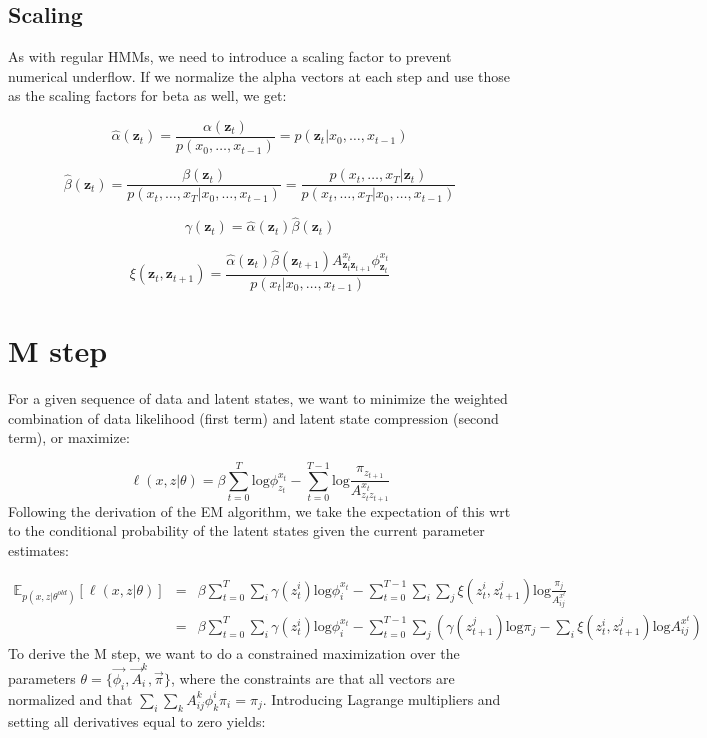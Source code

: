 \documentclass[11pt]{article}
\begin{document}
\subsection{Scaling}

As with regular HMMs, we need to introduce a scaling factor to prevent numerical underflow.  If we normalize the alpha vectors at each step and use those as the scaling factors for beta as well, we get:

\[
\hat{\alpha}(\mathbf{z}_t) = \frac{\alpha(\mathbf{z}_t)}{p(x_0,\ldots,x_{t-1})} = p(\mathbf{z}_t|x_0,\ldots,x_{t-1})
\]

\[
\hat{\beta}(\mathbf{z}_t) = \frac{\beta(\mathbf{z}_t)}{p(x_t,\ldots,x_T|x_0,\ldots,x_{t-1})} = \frac{p(x_t,\ldots,x_T|\mathbf{z}_t)}{p(x_t,\ldots,x_T|x_0,\ldots,x_{t-1})}
\]

\[
\gamma(\mathbf{z}_t) = \hat{\alpha}(\mathbf{z}_t)\hat{\beta}(\mathbf{z}_t)
\]

\[
\xi(\mathbf{z}_t,\mathbf{z}_{t+1}) = \frac{\hat{\alpha}(\mathbf{z}_t)\hat{\beta}(\mathbf{z}_{t+1})A^{x_t}_{\mathbf{z}_t\mathbf{z}_{t+1}}\phi^{x_t}_{\mathbf{z}_t}}{p(x_t|x_0,\ldots,x_{t-1})}
\]

\section{M step}

For a given sequence of data and latent states, we want to minimize the weighted combination of data likelihood (first term) and latent state compression (second term), or maximize:

\[
\ell(x,z|\theta) = \beta \sum_{t=0}^T \mathrm{log}\phi^{x_t}_{z_t} - \sum_{t=0}^{T-1} \mathrm{log}\frac{\pi_{z_{t+1}}}{A^{x_t}_{z_t z_{t+1}}}
\]
Following the derivation of the EM algorithm, we take the expectation of this wrt to the conditional probability of the latent states given the current parameter estimates:

\begin{eqnarray*}
\mathbb{E}_{p(x,z|\theta^{old})}[\ell(x,z|\theta)] & = & \beta\sum_{t=0}^T\sum_i \gamma(z_t^i) \mathrm{log}\phi_{i}^{x_t} - \sum_{t=0}^{T-1}\sum_i\sum_j \xi(z_{t}^i,z_{t+1}^j)\mathrm{log}\frac{\pi_j}{A^{x^t}_{ij}} \\
& = & \beta\sum_{t=0}^T\sum_i \gamma(z_t^i) \mathrm{log}\phi_{i}^{x_t} - \sum_{t=0}^{T-1}\sum_j \left(\gamma(z_{t+1}^j)\mathrm{log}\pi_j - \sum_i \xi(z_{t}^i,z_{t+1}^j)\mathrm{log}A^{x^t}_{ij}\right)
\end{eqnarray*}
To derive the M step, we want to do a constrained maximization over the parameters $\theta = \{\vec{\phi_i},\vec{A}^k_i,\vec{\pi}\}$, where the constraints are that all vectors are normalized and that $\sum_i\sum_k A^k_{ij} \phi^i_k\pi_i = \pi_j$.  Introducing Lagrange multipliers and setting all derivatives equal to zero yields:
\end{document}
